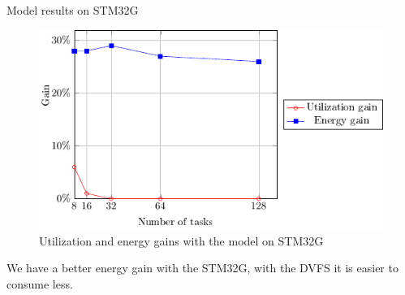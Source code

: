 \documentclass[
	11pt, %
]{beamer}
\begin{document}

\begin{frame}{Model results on STM32G}
	\begin{figure}
		\includegraphics{data/model/results_32g.pdf}
		\caption{Utilization and energy gains with the model on STM32G}
	\end{figure}
	We have a better energy gain with the STM32G, with the DVFS it is easier to consume less.
\end{frame}
\end{document}
